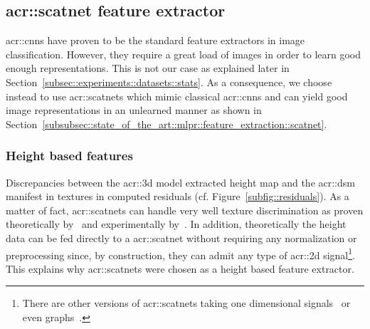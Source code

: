     \subsection{\texorpdfstring{\acrshort*{acr::scatnet}}{ScatNet} feature extractor}
        \label{subsec::learned_evaluation::richer_features::image}
        \glspl{acr::cnn} have proven to be the standard feature extractors in image classification.
        However, they require a great load of images in order to learn good enough representations.
        This is not our case as explained later in Section~\ref{subsec::experiments::datasets::stats}.
        As a consequence, we choose instead to use \glspl{acr::scatnet} which mimic classical \glspl{acr::cnn} and can yield good image representations in an unlearned manner as shown in Section~\ref{subsubsec::state_of_the_art::mlpr::feature_extraction::scatnet}.

        \subsubsection{Height based features}
            Discrepancies between the \gls{acr::3d} model extracted height map and the \gls{acr::dsm} manifest in textures in computed residuals (cf. Figure~\ref{subfig::residuals}).
            As a matter of fact, \glspl{acr::scatnet} can handle very well texture discrimination as proven theoretically by~\textcite{mallat2012group} and experimentally by~\textcite{bruna2013invariant,sifre2013rotation}.
            In addition, theoretically the height data can be fed directly to a \gls{acr::scatnet} without requiring any normalization or preprocessing since, by construction, they can admit any type of \gls{acr::2d} signal\footnote{There are other versions of \glspl{acr::scatnet} taking one dimensional signals~\parencite{anden2014deep} or even graphs~\parencite{eickenberg2018solid}.}.
            This explains why \glspl{acr::scatnet} were chosen as a height based feature extractor.\\

